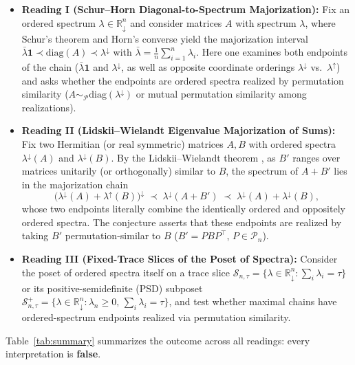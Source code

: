 \documentclass[11pt]{article}
\theoremstyle{definition}
\theoremstyle{remark}
\newcommand{\R}{\mathbb{R}}
\newcommand{\Pn}{\mathcal{P}_n}
\newcommand{\diag}{\mathrm{diag}}
\newcommand{\Ones}{\mathbf{1}}
\begin{document}
\begin{itemize}
  \item \textbf{Reading I (Schur--Horn Diagonal-to-Spectrum Majorization):}
  Fix an ordered spectrum $\lambda \in \R_\downarrow^n$ and consider matrices $A$
  with spectrum $\lambda$, where Schur's theorem \cite{Schur1923} and Horn's
  converse \cite{Horn1954} yield the majorization interval
  $\bar{\lambda}\Ones \prec \diag(A) \prec \lambda^\downarrow$ with
  $\bar{\lambda} = \frac{1}{n}\sum_{i=1}^n \lambda_i$. Here one examines both
  endpoints of the chain ($\bar{\lambda}\Ones$ and $\lambda^\downarrow$, as well
  as opposite coordinate orderings $\lambda^\downarrow$ vs.\ $\lambda^\uparrow$)
  and asks whether the endpoints are ordered spectra realized by permutation
  similarity ($A \sim_{\mathcal{P}} \diag(\lambda^\downarrow)$ or mutual
  permutation similarity among realizations).
  \item \textbf{Reading II (Lidskii--Wielandt Eigenvalue Majorization of Sums):}
  Fix two Hermitian (or real symmetric) matrices $A, B$ with ordered spectra
  $\lambda^\downarrow(A)$ and $\lambda^\downarrow(B)$. By the Lidskii--Wielandt
  theorem \cite{Lidskii1950,Wielandt1955}, as $B'$ ranges over matrices unitarily
  (or orthogonally) similar to $B$, the spectrum of $A + B'$ lies in the
  majorization chain
  \begin{equation}
    \label{eq:lidskii-chain}
    \bigl(\lambda^\downarrow(A) + \lambda^\uparrow(B)\bigr)^\downarrow
    \;\prec\; \lambda^\downarrow(A + B')
    \;\prec\; \lambda^\downarrow(A) + \lambda^\downarrow(B),
  \end{equation}
  whose two endpoints literally combine the identically ordered and oppositely
  ordered spectra. The conjecture asserts that these endpoints are realized by
  taking $B'$ permutation-similar to $B$ ($B' = P B P^\top$, $P \in \Pn$).
  \item \textbf{Reading III (Fixed-Trace Slices of the Poset of Spectra):}
  Consider the poset of ordered spectra itself on a trace slice
  $\mathcal{S}_{n,\tau} = \{ \lambda \in \R_\downarrow^n : \sum_i \lambda_i = \tau \}$
  or its positive-semidefinite (PSD) subposet
  $\mathcal{S}_{n,\tau}^+ = \{ \lambda \in \R_\downarrow^n : \lambda_n \ge 0,\,
  \sum_i \lambda_i = \tau \}$, and test whether maximal chains have ordered-spectrum
  endpoints realized via permutation similarity.
\end{itemize}

Table~\ref{tab:summary} summarizes the outcome across all readings: every
interpretation is \textbf{false}.
\end{document}
